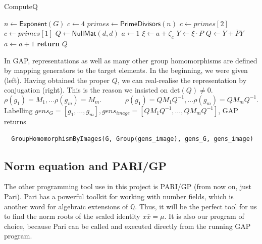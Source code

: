 \documentclass[11pt]{article}
\begin{document}
\begin{algorithm}
  \caption{ComputeQ}
  \label{alg:comp_q}
  \begin{algorithmic}
    \State $n \gets \textsf{Exponent}(G)$
      \State $c \gets 4$
    \Else
      \State $primes \gets \textsf{PrimeDivisors}(n)$
        \State $c \gets primes[2]$
      \Else
        \State $c \gets primes[1]$
      \EndIf
    \EndIf
    \State $Q \gets \textsf{NullMat}(d, d)$
    \State $a \gets 1$
      \State $\xi \gets a + \zeta_c$
      \State $Y \gets \xi \cdot P$
      \State $Q \gets \overline{Y} + \overline{P}Y$
      \State $a \gets a+1$
    \EndWhile
    \State \textbf{return} $Q$\
  \end{algorithmic}
\end{algorithm}

In GAP, representations as well as many other group homomorphisms are defined by mapping generators
to the target elements. In the beginning, we were given (left). Having obtained the proper $Q$, we
can real-realise the representation by conjugation (right). This is the reason we insisted on $\text{det}(Q) \neq 0$.
\setstretch{1.6}
\[\rho(g_1) = M_1, \ldots \rho(g_m) = M_m.~~~~~~~~~~~~~~~\rho(g_1) = QM_1Q^{-1}, \ldots \rho(g_m) = QM_mQ^{-1}.\]
\doublespacing
Labelling $gens_G = \left[g_1,\ldots,g_m\right], gens_{image} = \left[QM_1Q^{-1}, \ldots, QM_mQ^{-1}\right]$, GAP returns
\begin{verbatim}
  GroupHomomorphismByImages(G, Group(gens_image), gens_G, gens_image)
\end{verbatim}
\newpage
\subsection{Norm equation and PARI/GP} \label{sec:pari}

The other programming tool use in this project is PARI/GP \cite{PARI2}
(from now on, just Pari). Pari has a powerful toolkit for working with number
fields, which is another word for algebraic extensions of $\mathbb{Q}$. Thus, it
will be the perfect tool for us to find the norm roots of the scaled identity
$x\overline{x}=\mu$. It is also our program of choice, because Pari can be called
and executed directly from the running GAP program.
\end{document}
